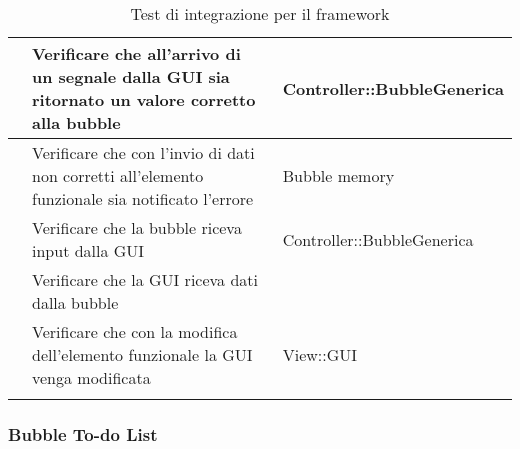 \begin{longtable}{|c|P{7cm}|P{5cm}|}
	\hline {} & Verificare che all'arrivo di un segnale dalla GUI sia ritornato un valore corretto alla bubble & Controller::BubbleGenerica \\
	\hline {} & Verificare che con l'invio di dati non corretti all'elemento funzionale sia notificato l'errore & Bubble memory \\
	\hline {} & Verificare che la bubble riceva input dalla GUI & Controller::BubbleGenerica \\
	\hline {} & Verificare che la GUI riceva dati dalla bubble & \\
	\hline {} & Verificare che con la modifica dell'elemento funzionale la GUI venga modificata & View::GUI \\
	\hline
	\caption{Test di integrazione per il framework}
\end{longtable}

\subsubsection{Bubble To-do List}


